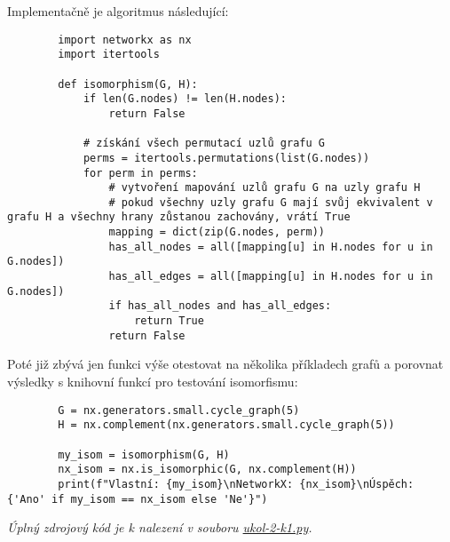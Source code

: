 \documentclass[10pt, a4paper]{ReportSheet}
\begin{document}
    Implementačně je algoritmus následující:
    \begin{verbatim}
        import networkx as nx
        import itertools

        def isomorphism(G, H):
            if len(G.nodes) != len(H.nodes):
                return False

            # získání všech permutací uzlů grafu G
            perms = itertools.permutations(list(G.nodes))
            for perm in perms:
                # vytvoření mapování uzlů grafu G na uzly grafu H
                # pokud všechny uzly grafu G mají svůj ekvivalent v grafu H a všechny hrany zůstanou zachovány, vrátí True
                mapping = dict(zip(G.nodes, perm))
                has_all_nodes = all([mapping[u] in H.nodes for u in G.nodes])
                has_all_edges = all([mapping[u] in H.nodes for u in G.nodes])
                if has_all_nodes and has_all_edges:
                    return True
                return False
    \end{verbatim}

    Poté již zbývá jen funkci výše otestovat na několika příkladech grafů a porovnat výsledky s knihovní funkcí pro
    testování isomorfismu:
    \begin{verbatim}
        G = nx.generators.small.cycle_graph(5)
        H = nx.complement(nx.generators.small.cycle_graph(5))

        my_isom = isomorphism(G, H)
        nx_isom = nx.is_isomorphic(G, nx.complement(H))
        print(f"Vlastní: {my_isom}\nNetworkX: {nx_isom}\nÚspěch: {'Ano' if my_isom == nx_isom else 'Ne'}")
    \end{verbatim}

    \textit{
        Úplný zdrojový kód je k nalezení v souboru \href{https://github.com/filipditrich/MMAD-2024/blob/main/ukol-2-k1.py}{ukol-2-k1.py}.
    }
    \newpage

    \newpage
\end{document}
